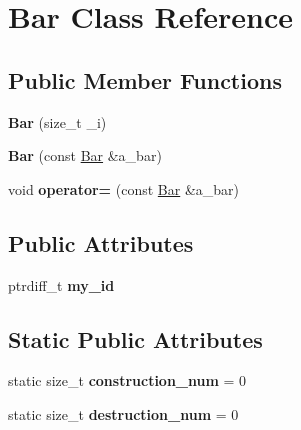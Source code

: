 \hypertarget{classBar}{}\section{Bar Class Reference}
\label{classBar}
\subsection*{Public Member Functions}
\begin{DoxyCompactItemize}
\item 
\hypertarget{classBar_a19f1513f05cd7bd8fd8333a10eb93890}{}{\bfseries Bar} (size\+\_\+t \+\_\+i)\label{classBar_a19f1513f05cd7bd8fd8333a10eb93890}

\item 
\hypertarget{classBar_a92cde342c30aa99f6909f8507848e6d3}{}{\bfseries Bar} (const \hyperlink{classBar}{Bar} \&a\+\_\+bar)\label{classBar_a92cde342c30aa99f6909f8507848e6d3}

\item 
\hypertarget{classBar_a7050d71b980306eb8c8b3bf19ee804ba}{}void {\bfseries operator=} (const \hyperlink{classBar}{Bar} \&a\+\_\+bar)\label{classBar_a7050d71b980306eb8c8b3bf19ee804ba}

\end{DoxyCompactItemize}
\subsection*{Public Attributes}
\begin{DoxyCompactItemize}
\item 
\hypertarget{classBar_ad84b4c12f4356953a917b890f6751f54}{}ptrdiff\+\_\+t {\bfseries my\+\_\+id}\label{classBar_ad84b4c12f4356953a917b890f6751f54}

\end{DoxyCompactItemize}
\subsection*{Static Public Attributes}
\begin{DoxyCompactItemize}
\item 
\hypertarget{classBar_a48f5725b96d8fe01f7b863d90a23a80c}{}static size\+\_\+t {\bfseries construction\+\_\+num} = 0\label{classBar_a48f5725b96d8fe01f7b863d90a23a80c}

\item 
\hypertarget{classBar_a4eecdc9eb6419d000ed68ed658d4e947}{}static size\+\_\+t {\bfseries destruction\+\_\+num} = 0\label{classBar_a4eecdc9eb6419d000ed68ed658d4e947}

\end{DoxyCompactItemize}
